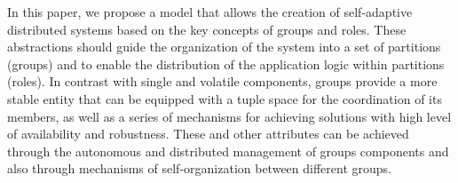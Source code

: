 
%
%

In this paper, we propose a model that allows the creation of self-adaptive distributed systems based on the key concepts of groups and roles. These abstractions should guide the organization of the system into a set of partitions (groups) and to enable the distribution of the application logic within partitions (roles). In contrast with single and volatile components, groups provide a more stable entity that can be equipped with a tuple space for the coordination of its members, as well as a series of mechanisms for achieving solutions with high level of availability and robustness. These and other attributes can be achieved through the autonomous and distributed management of groups components and also through mechanisms of self-organization between different groups.


